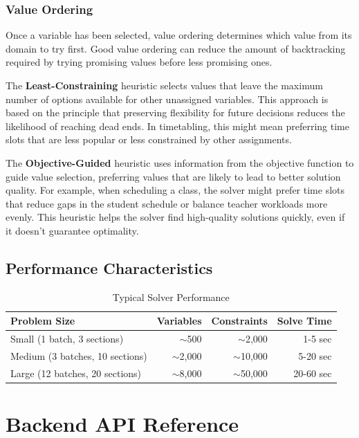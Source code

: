 \documentclass[12pt,a4paper]{article}
\begin{document}
\subsubsection{Value Ordering}

Once a variable has been selected, value ordering determines which value from its domain to try first. Good value ordering can reduce the amount of backtracking required by trying promising values before less promising ones.

The \textbf{Least-Constraining} heuristic selects values that leave the maximum number of options available for other unassigned variables. This approach is based on the principle that preserving flexibility for future decisions reduces the likelihood of reaching dead ends. In timetabling, this might mean preferring time slots that are less popular or less constrained by other assignments.

The \textbf{Objective-Guided} heuristic uses information from the objective function to guide value selection, preferring values that are likely to lead to better solution quality. For example, when scheduling a class, the solver might prefer time slots that reduce gaps in the student schedule or balance teacher workloads more evenly. This heuristic helps the solver find high-quality solutions quickly, even if it doesn't guarantee optimality.

\subsection{Performance Characteristics}

\begin{table}[h]
\centering
\begin{tabular}{@{}lrrr@{}}
\toprule
\textbf{Problem Size} & \textbf{Variables} & \textbf{Constraints} & \textbf{Solve Time} \\ \midrule
Small (1 batch, 3 sections) & $\sim$500 & $\sim$2,000 & 1-5 sec \\
Medium (3 batches, 10 sections) & $\sim$2,000 & $\sim$10,000 & 5-20 sec \\
Large (12 batches, 20 sections) & $\sim$8,000 & $\sim$50,000 & 20-60 sec \\
\bottomrule
\end{tabular}
\caption{Typical Solver Performance}
\end{table}

\section{Backend API Reference}
\end{document}
